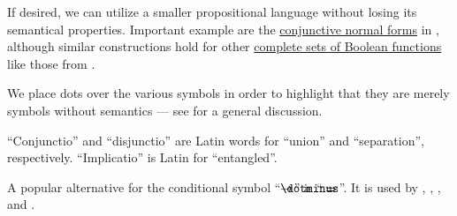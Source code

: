 \begin{comments}
  \item If desired, we can utilize a smaller propositional language without losing its semantical properties. Important example are the \hyperref[def:cnf_and_dnf]{conjunctive normal forms} in , although similar constructions hold for other \hyperref[def:boolean_closure/complete]{complete sets of Boolean functions} like those from .

  \item We place dots over the various symbols in order to highlight that they are merely symbols without semantics --- see  for a general discussion.

  \item \enquote{Conjunctio} and \enquote{disjunctio} are Latin words for \enquote{union} and \enquote{separation}, respectively. \enquote{Implicatio} is Latin for \enquote{entangled}.

  \item A popular alternative for the conditional symbol \enquote{\( \synimplies \)} is \enquote{\( \rightimply \)}. It is used by , , ,  and .
\end{comments}

